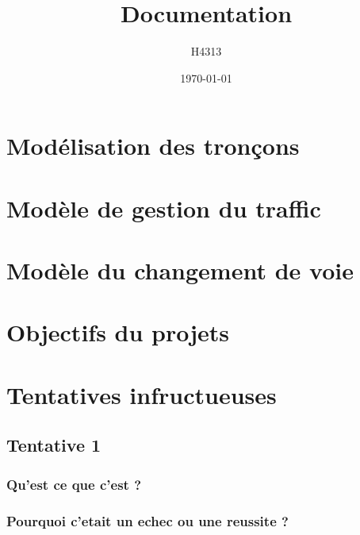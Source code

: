 \documentclass[11pt]{article}
\title{Documentation}
\author{H4313}
\date{\today}
\begin{document}
\maketitle
\tableofcontents
\newpage

\section{Modélisation des tronçons}

\section{Modèle de gestion du traffic}

\section{Modèle du changement de voie}

\section{Objectifs du projets}

\section{Tentatives infructueuses}

\subsection{Tentative 1}
\subsubsection{Qu'est ce que c'est ?}
\subsubsection{Pourquoi c'etait un echec ou une reussite ?}
\end{document}
